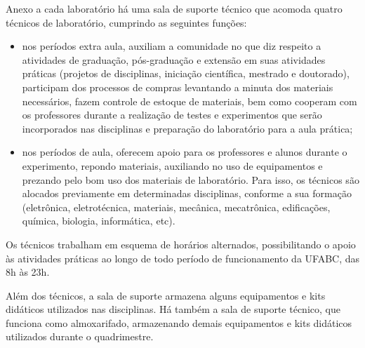 Anexo a cada laboratório há uma sala de suporte técnico que acomoda quatro
técnicos de laboratório, cumprindo as seguintes funções:
\begin{itemize}
    \item nos períodos extra aula, auxiliam a comunidade no que diz respeito a
    atividades de graduação, pós-graduação e extensão em suas atividades
    práticas (projetos de disciplinas, iniciação científica, mestrado e
    doutorado), participam dos processos de compras levantando a minuta dos
    materiais necessários, fazem controle de estoque de materiais, bem como
    cooperam com os professores durante a realização de testes e experimentos
    que serão incorporados nas disciplinas e preparação do laboratório para a
    aula prática;
    \item nos períodos de aula, oferecem apoio para os professores e alunos
    durante o experimento, repondo materiais, auxiliando no uso de equipamentos
    e prezando pelo bom uso dos materiais de laboratório. Para isso, os
    técnicos são alocados previamente em determinadas disciplinas, conforme a
    sua formação (eletrônica, eletrotécnica, materiais, mecânica, mecatrônica,
    edificações, química, biologia, informática, etc).
\end{itemize}
Os técnicos trabalham em esquema de horários alternados, possibilitando o apoio
às atividades práticas ao longo de todo período de funcionamento da UFABC, das
8h às 23h.

Além dos técnicos, a sala de suporte armazena alguns equipamentos e kits
didáticos utilizados nas disciplinas. 
Há também a sala de suporte técnico, que funciona como almoxarifado,
armazenando demais equipamentos e kits didáticos utilizados durante o
quadrimestre.

